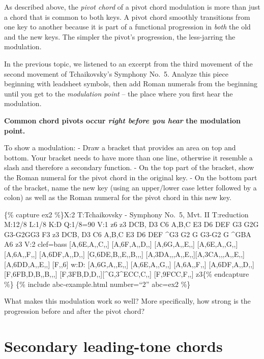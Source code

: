\documentclass{book}
\begin{document}
As described above, the \emph{pivot chord} of a pivot chord modulation is more
than just a chord that is common to both keys. A pivot chord smoothly
transitions from one key to another because it is part of a functional
progression in \emph{both} the old and the new keys. The simpler the pivot's
progression, the less-jarring the modulation.

In the previous topic, we listened to an excerpt from the third movement of
the second movement of Tchaikovsky's Symphony No.~5. Analyze this piece
beginning with leadsheet symbols, then add Roman numerals from the beginning
until you get to the \emph{modulation point} -- the place where you first hear
the modulation.

\textbf{Common chord pivots occur \emph{right before you hear} the modulation
point.}

To show a modulation: - Draw a bracket that provides an area on top and
bottom. Your bracket needs to have more than one line, otherwise it resemble a
slash and therefore a secondary function. - On the top part of the bracket,
show the Roman numeral for the pivot chord in the original key. - On the
bottom part of the bracket, name the new key (using an upper/lower case letter
followed by a colon) as well as the Roman numeral for the pivot chord in this
new key.

\{\% capture ex2 \%\}X:2 T:Tchaikovsky - Symphony No.~5, Mvt. II T:reduction
M:12/8 L:1/8 K:D Q:1/8=90 V:1 z6 z3 DCB,\textbar{} D3 C6 A,B,C\textbar{} E3 D6
DEF\textbar{} G3 G2G G3-G2G\textbar G3 F3 z3 DCB,\textbar{} D3 C6
A,B,C\textbar{} E3 D6 DEF\textbar{} \^{}G3 G2 G G3-G2 G\textbar{} \^{}GBA A6
z3\textbar{]} V:2 clef=bass {[}A,6E,A,,C,,{]} {[}A,6F,A,,D,,{]}\textbar{}
{[}A,6G,A,,E,,{]} {[}A,6E,A,,G,,{]}\textbar{} {[}A,6A,,F,,{]}
{[}A,6DF,A,,D,,{]}\textbar{} {[}G,6DE,B,,E,,B,,,{]}
{[}A,3DA,,,A,,E,,{]}{[}A,3CA,,,A,,E,,{]}\textbar{} {[}A,6DD,A,,E,,{]}
{[}F,,6{]}\textbar{} w:D: {[}A,6G,A,,E,,{]} {[}A,6E,A,,G,,{]}\textbar{}
{[}A,6A,,F,,{]} {[}A,6DF,A,,D,,{]}\textbar{} {[}F,6FB,D,B,,B,,,{]}
{[}F,3FB,D,D,,{]}{[}\^{}G,3\^{}ECC,C,,{]}\textbar{} {[}F,9FCC,F,,{]}
z3\textbar{]}\{\% endcapture \%\} \{\% include abc-example.html number=``2''
abc=ex2 \%\}

What makes this modulation work so well? More specifically, how strong is the
progression before and after the pivot chord?

\hypertarget{secondary-leading-tone-chords}{%
\section{Secondary leading-tone chords}\label{secondary-leading-tone-chords}}
\end{document}

